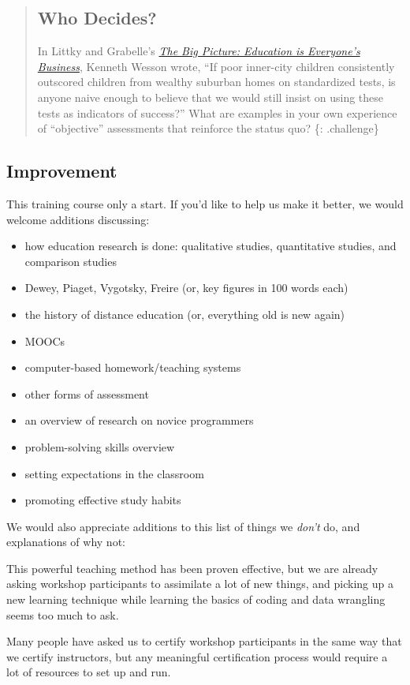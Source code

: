 \begin{quote}
\subsection{Who Decides?}\label{who-decides}

In Littky and Grabelle's
\emph{\href{http://www.amazon.com/Big-Picture-Education-Everyones-Business/dp/0871209713/}{The
Big Picture: Education is Everyone's Business}}, Kenneth Wesson wrote,
``If poor inner-city children consistently outscored children from
wealthy suburban homes on standardized tests, is anyone naive enough to
believe that we would still insist on using these tests as indicators of
success?'' What are examples in your own experience of ``objective''
assessments that reinforce the status quo? \{: .challenge\}
\end{quote}

\subsection{Improvement}

This training course only a start. If you'd like to help us make it
better, we would welcome additions discussing:

\begin{itemize}
\itemsep1pt\parskip0pt
\item
  how education research is done: qualitative studies, quantitative
  studies, and comparison studies
\item
  Dewey, Piaget, Vygotsky, Freire (or, key figures in 100 words each)
\item
  the history of distance education (or, everything old is new again)
\item
  MOOCs
\item
  computer-based homework/teaching systems
\item
  other forms of assessment
\item
  an overview of research on novice programmers
\item
  problem-solving skills overview
\item
  setting expectations in the classroom
\item
  promoting effective study habits
\end{itemize}

We would also appreciate additions to this list of things we
\emph{don't} do, and explanations of why not:

\begin{description}
\itemsep1pt\parskip0pt
\item[peer instruction]
This powerful teaching method has been proven effective, but we are
already asking workshop participants to assimilate a lot of new things,
and picking up a new learning technique while learning the basics of
coding and data wrangling seems too much to ask.
\item[certification]
Many people have asked us to certify workshop participants in the same
way that we certify instructors, but any meaningful certification
process would require a lot of resources to set up and run.
\end{description}

